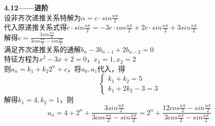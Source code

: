 \documentclass[a4paper,12pt]{article}
\begin{document}
	\noindent
	\textbf{4.12——进阶}\\
	设非齐次递推关系特解为$\alpha=c \cdot sin\frac{n\pi}{2}$\\
	代入原递推关系式得$c \cdot sin\frac{n\pi}{2}=-3c \cdot cos\frac{n\pi}{2}+2c \cdot sin\frac{n\pi}{2}+3sin\frac{n\pi}{2}$\\
	解得$c=\frac{3sin\frac{n\pi}{2}}{3cos\frac{n\pi}{2}-sin\frac{n\pi}{2}}$\\
	满足齐次递推关系的通解$b_{n}-3b_{n-1}+2b_{n-2}=0$\\
	特征方程为$x^2-3x+2=0$，$x_1=1,x_2=2$\\
	则$a_n=k_1 + k_2 2^n + c$，将$a_0,a_1$代入，得\\
	$$
	\begin{cases}
		k_1 + k_2=5\\
		k_1 + 2k_2 -3=3
	\end{cases}
	$$
	解得$k_1=4,k_2=1$，则\[
		a_n=4+2^n+\frac{3sin\frac{n\pi}{2}}{3cos\frac{n\pi}{2}-sin\frac{n\pi}{2}}=2^n+\frac{12cos\frac{n\pi}{2}-sin\frac{n\pi}{2}}{3cos\frac{n\pi}{2}-sin\frac{n\pi}{2}}
	\]
	
	
\end{document}
